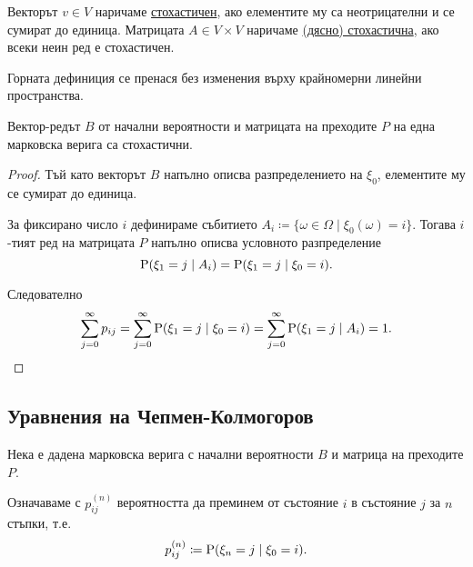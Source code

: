 \documentclass[numbers=endperiod, DIV=15, bibliography=totocnumbered]{scrartcl}
\begin{document}
\begin{definition}
  Векторът $v \in V$ наричаме \uline{стохастичен}, ако елементите му са неотрицателни и се сумират до единица. Матрицата $A \in V \times V$ наричаме \uline{(дясно) стохастична}, ако всеки неин ред е стохастичен.
\end{definition}

\begin{note}
  Горната дефиниция се пренася без изменения върху крайномерни линейни пространства.
\end{note}

\begin{proposition}
  Вектор-редът $B$ от начални вероятности и матрицата на преходите $P$ на една марковска верига са стохастични.
\end{proposition}
\begin{proof}
  Тъй като векторът $B$ напълно описва разпределението на $\xi_0$, елементите му се сумират до единица.

  За фиксирано число $i$ дефинираме събитието $A_i \coloneqq \{ \omega \in \Omega \mid \xi_0(\omega) = i \}$. Тогава $i$-тият ред на матрицата $P$ напълно описва условното разпределение
  \begin{displaymath}
    \operatorname{P}(\xi_1 = j \mid A_i)
    =
    \operatorname{P}(\xi_1 = j \mid \xi_0 = i).
  \end{displaymath}

  Следователно
  \begin{displaymath}
    \sum_{j=0}^\infty p_{ij}
    =
    \sum_{j=0}^\infty \operatorname{P}(\xi_1 = j \mid \xi_0 = i)
    =
    \sum_{j=0}^\infty \operatorname{P}(\xi_1 = j \mid A_i)
    =
    1.
  \end{displaymath}
\end{proof}

\subsection{Уравнения на Чепмен-Колмогоров}

Нека е дадена марковска верига с начални вероятности $B$ и матрица на преходите $P$.

Означаваме с $p^{(n)}_{ij}$ вероятността да преминем от състояние $i$ в състояние $j$ за $n$ стъпки, т.е.
\begin{displaymath}
  p^{(n)}_{ij} \coloneqq \operatorname{P}(\xi_n = j \mid \xi_0 = i).
\end{displaymath}
\end{document}
